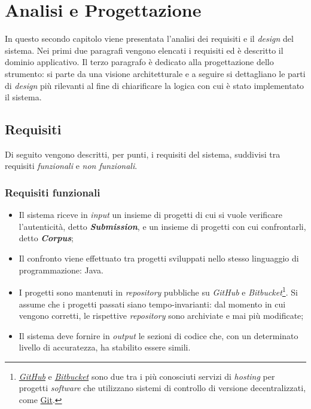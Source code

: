 \chapter{Analisi e Progettazione}
\label{chapter:analysis}
In questo secondo capitolo viene presentata l'analisi dei requisiti e il \textit{design} del sistema.
%
Nei primi due paragrafi vengono elencati i requisiti ed è descritto il dominio applicativo.
%
Il terzo paragrafo è dedicato alla progettazione dello strumento: si parte da una visione architetturale e a seguire si dettagliano le parti di \textit{design} più rilevanti al fine di chiarificare la logica con cui è stato implementato il sistema.

\section{Requisiti}
Di seguito vengono descritti, per punti, i requisiti del sistema, suddivisi tra requisiti \textit{funzionali} e \textit{non funzionali}.

\subsection*{Requisiti funzionali}
\begin{itemize}
    \item Il sistema riceve in \textit{input} un insieme di progetti di cui si vuole verificare l'autenticità, detto \textbf{\textit{Submission}}, e un insieme di progetti con cui confrontarli, detto \textbf{\textit{Corpus}};
    
    \item Il confronto viene effettuato tra progetti sviluppati nello stesso linguaggio di programmazione: Java.
    
    \item I progetti sono mantenuti in \textit{repository} pubbliche su \textit{GitHub} e \textit{Bitbucket}\footnote{
        \href{https://github.com}{\textit{GitHub}} e \href{https://bitbucket.org}{\textit{Bitbucket}} sono due tra i più conosciuti servizi di \textit{hosting} per progetti \textit{software} che utilizzano sistemi di controllo di versione decentralizzati, come \href{https://git-scm.com}{Git}.
    }. Si assume che i progetti passati siano tempo-invarianti: dal momento in cui vengono corretti, le rispettive \textit{repository} sono archiviate e mai più modificate;

    \item Il sistema deve fornire in \textit{output} le sezioni di codice che, con un determinato livello di accuratezza, ha stabilito essere simili.
\end{itemize}

